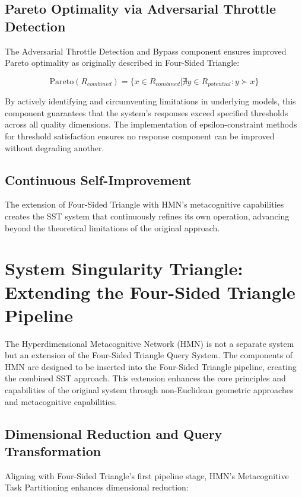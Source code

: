 \documentclass[journal,onecolumn]{IEEEtran}
\begin{document}
\subsection{Pareto Optimality via Adversarial Throttle Detection}

The Adversarial Throttle Detection and Bypass component ensures improved Pareto optimality as originally described in Four-Sided Triangle:

\begin{equation}
\text{Pareto}(R_{combined}) = \{x \in R_{combined} | \nexists y \in R_{potential}: y \succ x\}
\end{equation}

By actively identifying and circumventing limitations in underlying models, this component guarantees that the system's responses exceed specified thresholds across all quality dimensions. The implementation of epsilon-constraint methods for threshold satisfaction ensures no response component can be improved without degrading another.

\subsection{Continuous Self-Improvement}

The extension of Four-Sided Triangle with HMN's metacognitive capabilities creates the SST system that continuously refines its own operation, advancing beyond the theoretical limitations of the original approach.

\section{System Singularity Triangle: Extending the Four-Sided Triangle Pipeline}

The Hyperdimensional Metacognitive Network (HMN) is not a separate system but an extension of the Four-Sided Triangle Query System. The components of HMN are designed to be inserted into the Four-Sided Triangle pipeline, creating the combined SST approach. This extension enhances the core principles and capabilities of the original system through non-Euclidean geometric approaches and metacognitive capabilities.

\subsection{Dimensional Reduction and Query Transformation}

Aligning with Four-Sided Triangle's first pipeline stage, HMN's Metacognitive Task Partitioning enhances dimensional reduction:
\end{document}

